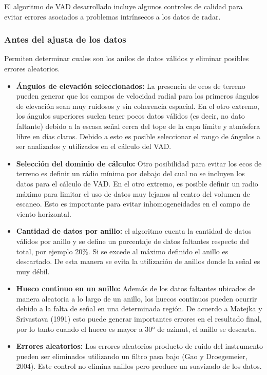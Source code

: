 \documentclass[12pt,spanish,oneside]{book}
\providecommand{\tightlist}{%
  \setlength{\itemsep}{0pt}\setlength{\parskip}{0pt}}
\begin{document}
El algoritmo de VAD desarrollado incluye algunos controles de calidad
para evitar errores asociados a problemas intrínsecos a los datos de
radar.

\subsubsection{Antes del ajusta de los
datos}\label{antes-del-ajusta-de-los-datos}

Permiten determinar cuales son los anilos de datos válidos y eliminar
posibles errores aleatorios.

\begin{itemize}
\tightlist
\item
  \textbf{Ángulos de elevación seleccionados:} La presencia de ecos de
  terreno pueden generar que los campos de velocidad radial para los
  primeros ángulos de elevación sean muy ruidosos y sin coherencia
  espacial. En el otro extremo, los ángulos superiores suelen tener
  pocos datos válidos (es decir, no dato faltante) debido a la escasa
  señal cerca del tope de la capa límite y atmósfera libre en días
  claros. Debido a esto es posible seleccionar el rango de ángulos a ser
  analizados y utilizados en el cálculo del VAD.
\item
  \textbf{Selección del dominio de cálculo:} Otro posibilidad para
  evitar los ecos de terreno es definir un rádio mínimo por debajo del
  cual no se incluyen los datos para el cálculo de VAD. En el otro
  extremo, es posible definir un radio máximo para limitar el uso de
  datos muy lejanos al centro del volumen de escaneo. Esto es importante
  para evitar inhomogeneidades en el campo de viento horizontal.
\item
  \textbf{Cantidad de datos por anillo:} el algoritmo cuenta la cantidad
  de datos válidos por anillo y se define un porcentaje de datos
  faltantes respecto del total, por ejemplo 20\%. Si se excede al máximo
  definido el anillo es descartado. De esta manera se evita la
  utilización de anillos donde la señal es muy débil.
\item
  \textbf{Hueco continuo en un anillo:} Además de los datos faltantes
  ubicados de manera aleatoria a lo largo de un anillo, los huecos
  continuos pueden ocurrir debido a la falta de señal en una determinada
  región. De acuerdo a Matejka y Srivastava (1991) esto puede generar
  importantes errores en el resultado final, por lo tanto cuando el
  hueco es mayor a 30° de azimut, el anillo se descarta.
\item
  \textbf{Errores aleatorios:} Los errores aleatorios producto de ruido
  del instrumento pueden ser eliminados utilizando un filtro pasa bajo
  (Gao y Droegemeier, 2004). Este control no elimina anillos pero
  produce un suavizado de los datos.
\end{itemize}
\end{document}
